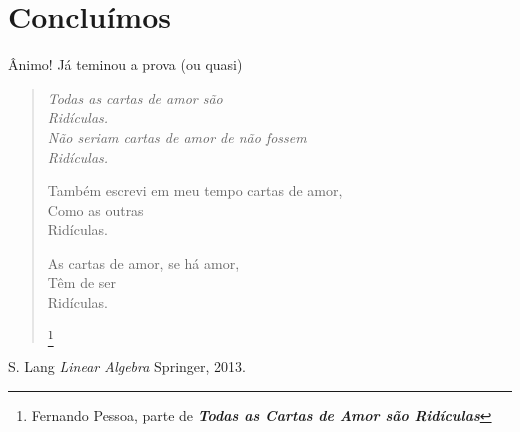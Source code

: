 \documentclass[a4paper,11pt]{article}
\theoremstyle{definition}
\begin{document}
\section{Concluímos}
Ânimo! Já teminou a prova (ou quasi)


\begin{quotation}
 {\itshape
Todas as cartas de amor são\\
Ridículas.\\
Não seriam cartas de amor de não fossem\\
Ridículas.

\vspace{.4cm}
Também escrevi em meu tempo cartas de amor,\\
Como as outras\\
Ridículas.

\vspace{.4cm}
As cartas de amor, se há amor,\\
Têm de ser\\
Ridículas.} \footnote{Fernando Pessoa, parte de  \textbf{ \textit {Todas as Cartas de Amor são Ridículas}}}
\end{quotation}
\begin{thebibliography}{9}
 S. Lang \emph{Linear Algebra} Springer, 2013.
\end{thebibliography}
\end{document}

